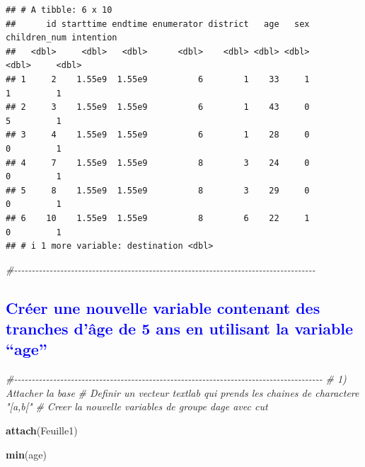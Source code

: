 \documentclass[
]{article}
\newenvironment{Shaded}{\begin{snugshade}}{\end{snugshade}}
\newcommand{\CommentTok}[1]{\textcolor[rgb]{0.56,0.35,0.01}{\textit{#1}}}
\newcommand{\FunctionTok}[1]{\textcolor[rgb]{0.13,0.29,0.53}{\textbf{#1}}}
\newcommand{\NormalTok}[1]{#1}
\begin{document}
\begin{verbatim}
## # A tibble: 6 x 10
##      id starttime endtime enumerator district   age   sex children_num intention
##   <dbl>     <dbl>   <dbl>      <dbl>    <dbl> <dbl> <dbl>        <dbl>     <dbl>
## 1     2    1.55e9  1.55e9          6        1    33     1            1         1
## 2     3    1.55e9  1.55e9          6        1    43     0            5         1
## 3     4    1.55e9  1.55e9          6        1    28     0            0         1
## 4     7    1.55e9  1.55e9          8        3    24     0            0         1
## 5     8    1.55e9  1.55e9          8        3    29     0            0         1
## 6    10    1.55e9  1.55e9          8        6    22     1            0         1
## # i 1 more variable: destination <dbl>
\end{verbatim}

\begin{Shaded}
\begin{Highlighting}[]
\CommentTok{\#{-}{-}{-}{-}{-}{-}{-}{-}{-}{-}{-}{-}{-}{-}{-}{-}{-}{-}{-}{-}{-}{-}{-}{-}{-}{-}{-}{-}{-}{-}{-}{-}{-}{-}{-}{-}{-}{-}{-}{-}{-}{-}{-}{-}{-}{-}{-}{-}{-}{-}{-}{-}{-}{-}{-}{-}{-}{-}{-}{-}{-}{-}{-}{-}{-}{-}{-}{-}{-}{-}{-}{-}{-}{-}{-}{-}{-}{-}{-}{-}{-}{-}{-}{-}{-}}
\end{Highlighting}
\end{Shaded}

\textcolor{blue}{\subsection{Créer une nouvelle variable contenant des tranches d’âge de 5 ans en utilisant la variable “age”}}

\begin{Shaded}
\begin{Highlighting}[]
\CommentTok{\#{-}{-}{-}{-}{-}{-}{-}{-}{-}{-}{-}{-}{-}{-}{-}{-}{-}{-}{-}{-}{-}{-}{-}{-}{-}{-}{-}{-}{-}{-}{-}{-}{-}{-}{-}{-}{-}{-}{-}{-}{-}{-}{-}{-}{-}{-}{-}{-}{-}{-}{-}{-}{-}{-}{-}{-}{-}{-}{-}{-}{-}{-}{-}{-}{-}{-}{-}{-}{-}{-}{-}{-}{-}{-}{-}{-}{-}{-}{-}{-}{-}{-}{-}{-}{-}{-}{-}}
\CommentTok{\#  1)  Attacher la base }
\CommentTok{\#    Definir un vecteur textlab qui prends les chaines de charactere "[a,b["}
\CommentTok{\#    Creer la nouvelle variables de groupe d\textquotesingle{}age avec cut}

\FunctionTok{attach}\NormalTok{(Feuille1)}

\FunctionTok{min}\NormalTok{(age)}
\end{Highlighting}
\end{Shaded}
\end{document}
